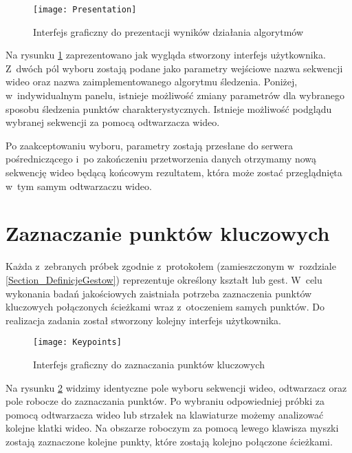     \begin{figure}[!ht]
      \centering
      \texttt{[image: Presentation]}
      \caption[Interfejs graficzny do prezentacji wyników działania algorytmów]{Interfejs graficzny do prezentacji wyników działania algorytmów}
      \label{fig:AlgorithmsPresentation}
    \end{figure}

    Na rysunku \ref{fig:AlgorithmsPresentation} zaprezentowano jak wygląda stworzony interfejs użytkownika. Z~dwóch pól wyboru zostają podane jako parametry wejściowe nazwa sekwencji wideo oraz nazwa zaimplementowanego algorytmu śledzenia. Poniżej, w~indywidualnym panelu, istnieje możliwość zmiany parametrów dla wybranego sposobu śledzenia punktów charakterystycznych. Istnieje możliwość podglądu wybranej sekwencji za pomocą odtwarzacza wideo.

    Po zaakceptowaniu wyboru, parametry zostają przesłane do serwera pośredniczącego i~po zakończeniu przetworzenia danych otrzymamy nową sekwencję wideo będącą końcowym rezultatem, która może zostać przeglądnięta w~tym samym odtwarzaczu wideo.

  \section{Zaznaczanie punktów kluczowych}\label{Section_Keypoints}
    Każda z~zebranych próbek zgodnie z~protokołem (zamieszczonym w~rozdziale \ref{Section_DefinicjeGestow}) reprezentuje określony kształt lub gest. W~celu wykonania badań jakościowych zaistniała potrzeba zaznaczenia punktów kluczowych połączonych ścieżkami wraz z~otoczeniem samych punktów. Do realizacja zadania został stworzony kolejny interfejs użytkownika.

    \begin{figure}[!ht]
      \centering
      \texttt{[image: Keypoints]}
      \caption[Interfejs graficzny do zaznaczania punktów kluczowych]{Interfejs graficzny do zaznaczania punktów kluczowych}
      \label{fig:Keypoints}
    \end{figure}

    Na rysunku \ref{fig:Keypoints} widzimy identyczne pole wyboru sekwencji wideo, odtwarzacz oraz pole robocze do zaznaczania punktów. Po wybraniu odpowiedniej próbki za pomocą odtwarzacza wideo lub strzałek na klawiaturze możemy analizować kolejne klatki wideo. Na obszarze roboczym za pomocą lewego klawisza myszki zostają zaznaczone kolejne punkty, które zostają kolejno połączone ścieżkami.

